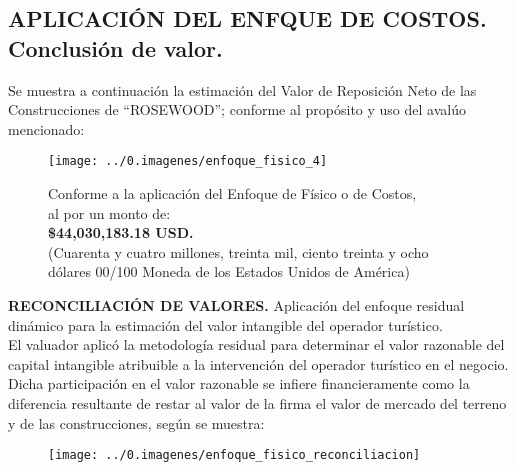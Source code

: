 \subsection{APLICACIÓN DEL ENFQUE DE COSTOS. Conclusión de valor.}
Se muestra a continuación la estimación del Valor de Reposición Neto de las Construcciones de ``ROSEWOOD''; conforme al propósito y uso del avalúo mencionado:

\begin{figure}[H]
\centering
\texttt{[image: ../0.imagenes/enfoque\_fisico\_4]}

Conforme a la aplicación del Enfoque de Físico o de Costos, \\
al \fechaValoresCorto{} por un monto de:\\
\textbf{\$44,030,183.18 USD.}\\
(Cuarenta y cuatro millones, treinta mil, ciento treinta y ocho d\'olares 00/100 Moneda de los Estados Unidos de Am\'erica)
\end{figure}

\textcolor{principal}{\textbf{RECONCILIACIÓN DE VALORES.} Aplicación del enfoque residual dinámico para la estimación del valor intangible del operador turístico.}\\

 El valuador aplicó la metodología residual para determinar el valor razonable del capital intangible atribuible  a la intervención del operador turístico en el negocio. Dicha participación en el valor razonable se infiere financieramente como la diferencia resultante de restar al valor de la firma el valor de mercado del terreno y de las construcciones, según se muestra:
 
 \begin{figure}[H]
\centering
\texttt{[image: ../0.imagenes/enfoque\_fisico\_reconciliacion]}

\end{figure}




